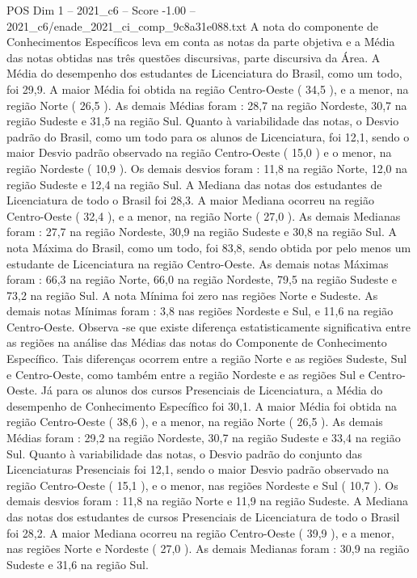 \begin{textsample}{POS Dim 1 – 2021\_c6 – Score -1.00 – 2021\_c6/enade\_2021\_ci\_comp\_9c8a31e088.txt}
A nota do componente de Conhecimentos Específicos leva em conta as notas da parte objetiva e a Média das notas obtidas nas três questões discursivas, parte discursiva da Área.
A Média do desempenho dos estudantes de Licenciatura do Brasil, como um todo, foi 29,9.
A maior Média foi obtida na região Centro-Oeste ( 34,5 ), e a menor, na região Norte ( 26,5 ).
As demais Médias foram : 28,7 na região Nordeste, 30,7 na região Sudeste e 31,5 na região Sul.
Quanto à variabilidade das notas, o Desvio padrão do Brasil, como um todo para os alunos de Licenciatura, foi 12,1, sendo o maior Desvio padrão observado na região Centro-Oeste ( 15,0 ) e o menor, na região Nordeste ( 10,9 ).
Os demais desvios foram : 11,8 na região Norte, 12,0 na região Sudeste e 12,4 na região Sul.
A Mediana das notas dos estudantes de Licenciatura de todo o Brasil foi 28,3.
A maior Mediana ocorreu na região Centro-Oeste ( 32,4 ), e a menor, na região Norte ( 27,0 ).
As demais Medianas foram : 27,7 na região Nordeste, 30,9 na região Sudeste e 30,8 na região Sul.
A nota Máxima do Brasil, como um todo, foi 83,8, sendo obtida por pelo menos um estudante de Licenciatura na região Centro-Oeste.
As demais notas Máximas foram : 66,3 na região Norte, 66,0 na região Nordeste, 79,5 na região Sudeste e 73,2 na região Sul.
A nota Mínima foi zero nas regiões Norte e Sudeste.
As demais notas Mínimas foram : 3,8 nas regiões Nordeste e Sul, e 11,6 na região Centro-Oeste.
Observa -se que existe diferença estatisticamente significativa entre as regiões na análise das Médias das notas do Componente de Conhecimento Específico.
Tais diferenças ocorrem entre a região Norte e as regiões Sudeste, Sul e Centro-Oeste, como também entre a região Nordeste e as regiões Sul e Centro-Oeste.
Já para os alunos dos cursos Presenciais de Licenciatura, a Média do desempenho de Conhecimento Específico foi 30,1.
A maior Média foi obtida na região Centro-Oeste ( 38,6 ), e a menor, na região Norte ( 26,5 ).
As demais Médias foram : 29,2 na região Nordeste, 30,7 na região Sudeste e 33,4 na região Sul.
Quanto à variabilidade das notas, o Desvio padrão do conjunto das Licenciaturas Presenciais foi 12,1, sendo o maior Desvio padrão observado na região Centro-Oeste ( 15,1 ), e o menor, nas regiões Nordeste e Sul ( 10,7 ).
Os demais desvios foram : 11,8 na região Norte e 11,9 na região Sudeste.
A Mediana das notas dos estudantes de cursos Presenciais de Licenciatura de todo o Brasil foi 28,2.
A maior Mediana ocorreu na região Centro-Oeste ( 39,9 ), e a menor, nas regiões Norte e Nordeste ( 27,0 ).
As demais Medianas foram : 30,9 na região Sudeste e 31,6 na região Sul.

\end{textsample}
